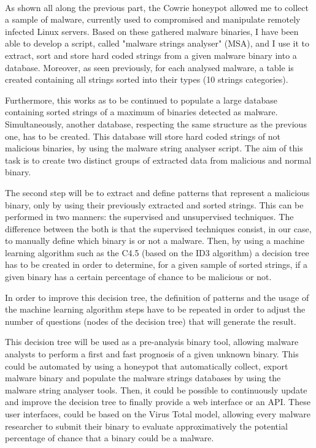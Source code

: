 \paragraph{}

As shown all along the previous part, the Cowrie honeypot allowed me to collect a sample
of malware, currently used to compromised and manipulate remotely infected Linux servers.
Based on these gathered malware binaries, I have been able to develop a script,
called "malware strings analyser" (MSA), and I use it to extract, sort and store hard coded
strings from a given malware binary into a database. Moreover, as seen previously, for each
analysed malware, a table is created containing all strings sorted into their types (10 
strings categories).

Furthermore, this works as to be continued to populate a large database containing sorted
strings of a maximum of binaries detected as malware.
Simultaneously, another database, respecting the same structure as the previous one, has to
be created. This database will store hard coded strings of not malicious binaries, by using
the malware string analyser script. The aim of this task is to create two distinct groups
of extracted data from malicious and normal binary.

The second step will be to extract and define patterns that represent a malicious binary,
only by using their previously extracted and sorted strings. This can be performed in two
manners: the supervised and unsupervised techniques. The difference between the both is that
the supervised techniques consist, in our case, to manually define which binary is or not
a malware. Then, by using a machine learning algorithm such as the C4.5 (based on the ID3 
algorithm) a decision tree has to be created in order to determine, for a given sample of
sorted strings, if a given binary has a certain percentage of chance to be malicious or not.

In order to improve this decision tree, the definition of patterns and the usage of the 
machine learning algorithm steps have to be repeated in order to adjust the number of
questions (nodes of the decision tree) that will generate the result.

This decision tree will be used as a pre-analysis binary tool, allowing malware analysts
to perform a first and fast prognosis of a given unknown binary.
This could be automated by using a honeypot that automatically collect, export malware
binary and populate the malware strings databases by using the malware string analyser
tools. Then, it could be possible to continuously update and improve the decision tree to 
finally provide a web interface or an API. These user interfaces,
could be based on the Virus Total model, allowing every malware researcher to submit their
binary to evaluate approximatively the potential percentage of chance that a binary could
be a malware.